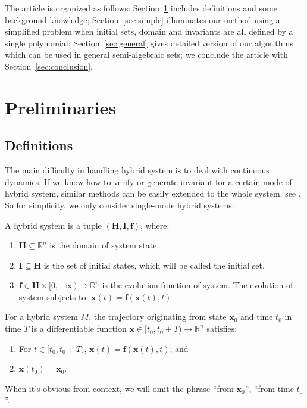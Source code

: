 \documentclass{jssc}
\begin{document}
The article is organized as follows: Section~\ref{sec:preliminaries} includes definitions and some background knowledge; Section~\ref{sec:simple} illuminates our method using a simplified problem when initial sets, domain and invariants are all defined by a single polynomial; Section~\ref{sec:general} gives detailed version of our algorithms which can be used in general semi-algebraic sets; we conclude the article with Section~\ref{sec:conclusion}.

\section{Preliminaries}
\label{sec:preliminaries}
\subsection{Definitions}
The main difficulty in handling hybrid system is to deal with continuous dynamics. If we know how to verify or generate invariant for a certain mode of hybrid system, similar methods can be easily extended to the whole system, see \cite{prajna2004safety, kong2016invariant}. So for simplicity, we only consider single-mode hybrid systems:

\begin{definition}
A hybrid system is a tuple $(\boldsymbol{H}, \boldsymbol{I}, \boldsymbol{f})$,  where: 
	\begin{enumerate}
		\item $\boldsymbol{H} \subseteq \mathbb{R}^n$  is the domain of system state.
		\item $\boldsymbol{I} \subseteq \boldsymbol{H}$ is the set of initial states, which will be called the initial set.
		\item $\boldsymbol{f} \in \boldsymbol{H} \times [0, +\infty) \rightarrow \mathbb{R}^n$ is the evolution function of system. The evolution of system subjects to: $\dot{\boldsymbol{x}}(t) = \boldsymbol{f}(\boldsymbol{x}(t),t)$.
	\end{enumerate}
\end{definition}

\begin{definition}[Trajectory]
For a hybrid system $M$, the trajectory originating from state $\boldsymbol{x}_0$ and time $t_0$ in time $T$ is a differentiable function $\boldsymbol{x} \in [t_0, t_0 + T) \rightarrow \mathbb{R}^n$ satisfies:
	\begin{enumerate}
		\item For $t \in [t_0, t_0 + T)$, $\dot{\boldsymbol{x}}(t) = \boldsymbol{f}(\boldsymbol{x}(t),t)$; and 
		\item $\boldsymbol{x}(t_0) = \boldsymbol{x}_0$.
	\end{enumerate}
	
When it's obvious from context, we will omit the phrase ``from $\boldsymbol{x}_0$'', ``from time $t_0$''.
\end{definition}
\end{document}
